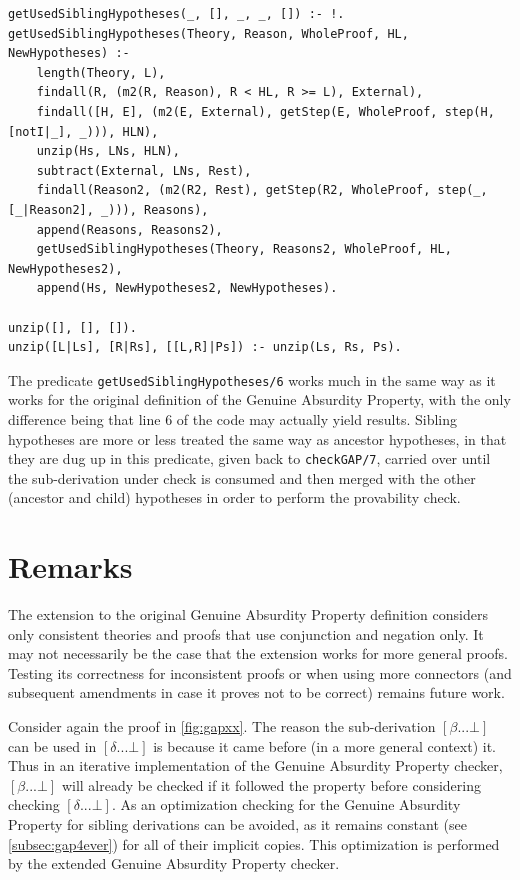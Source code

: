 \documentclass[11pt,twoside,a4paper]{report}
\begin{document}
\begin{lstlisting}[caption={Gathering of referenced sibling derivations for the extended Genuine Absurdity Property definition},label=lst:sibmining]
% Uses the line references to find referenced sibling derivations
getUsedSiblingHypotheses(_, [], _, _, []) :- !.
getUsedSiblingHypotheses(Theory, Reason, WholeProof, HL, NewHypotheses) :-
	length(Theory, L),
	findall(R, (m2(R, Reason), R < HL, R >= L), External),
	findall([H, E], (m2(E, External), getStep(E, WholeProof, step(H, [notI|_], _))), HLN),
	unzip(Hs, LNs, HLN),
	subtract(External, LNs, Rest),
	findall(Reason2, (m2(R2, Rest), getStep(R2, WholeProof, step(_, [_|Reason2], _))), Reasons),
	append(Reasons, Reasons2),
	getUsedSiblingHypotheses(Theory, Reasons2, WholeProof, HL, NewHypotheses2),
	append(Hs, NewHypotheses2, NewHypotheses).
	
unzip([], [], []).
unzip([L|Ls], [R|Rs], [[L,R]|Ps]) :- unzip(Ls, Rs, Ps).
\end{lstlisting}

The predicate \lstinline$getUsedSiblingHypotheses/6$ works much in the same way as it works for the original definition of the Genuine Absurdity Property, with the only difference being that line 6 of the code may actually yield results. Sibling hypotheses are more or less treated the same way as ancestor hypotheses, in that they are dug up in this predicate, given back to \lstinline$checkGAP/7$, carried over until the sub-derivation under check is consumed and then merged with the other (ancestor and child) hypotheses in order to perform the provability check.

\section{Remarks}
The extension to the original Genuine Absurdity Property definition considers only consistent theories and proofs that use conjunction and negation only. It may not necessarily be the case that the extension works for more general proofs. Testing its correctness for inconsistent proofs or when using more connectors (and subsequent amendments in case it proves not to be correct) remains future work.

Consider again the proof in \autoref{fig:gapxx}. The reason the sub-derivation $[\beta ... \bot]$ can be used in $[\delta ... \bot]$ is because it came before (in a more general context) it. Thus in an iterative implementation of the Genuine Absurdity Property checker, $[\beta ... \bot]$ will already be checked if it followed the property before considering checking $[\delta ... \bot]$. As an optimization checking for the Genuine Absurdity Property for sibling derivations can be avoided, as it remains constant (see \autoref{subsec:gap4ever}) for all of their implicit copies. This optimization is performed by the extended Genuine Absurdity Property checker.
\end{document}
